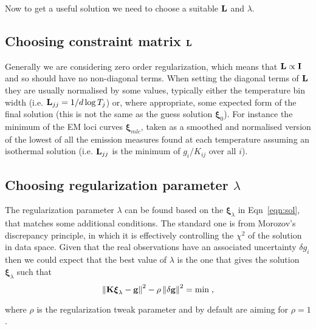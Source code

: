 \documentclass[12pt,a4paper]{article}
\begin{document}
Now to get a useful solution we need to choose a suitable ${\bf L}$ and $\lambda$.

\newpage
\vspace{-10pt}
\subsection*{Choosing constraint matrix ${\bf L}$}

Generally we are considering zero order regularization, which means that ${\bf L} \propto {\bf I}$ and so should have no non-diagonal terms. When setting the diagonal terms of ${\bf L}$ they are usually normalised by some values, typically either the temperature bin width (i.e. ${\bf L}_{jj}=1/d \log T_j$) or, where appropriate, some expected form of the final solution (this is not the same as the guess solution $\boldsymbol{\xi}_0$). For instance the minimum of the EM loci curves $\boldsymbol{\xi}_{mlc}$, taken as a smoothed and normalised version of the lowest of all the emission measures found at each temperature assuming an isothermal solution (i.e. ${\bf L}_{jj}$ is the minimum of $g_i/K_{ij}$ over all $i$).


\vspace{-10pt}
\subsection*{Choosing regularization parameter $\lambda$}

The regularization parameter $\lambda$ can be found based on the $\boldsymbol{\xi}_\lambda$ in Eqn~\ref{eqn:sol}, that matches some additional conditions. The standard one is from Morozov's discrepancy principle, in which it is effectively controlling the $\chi^2$ of the solution in data space. Given that the real observations have an associated uncertainty $\delta g_i$ then we could expect that the best value of $\lambda$ is the one that gives the solution $\boldsymbol{\xi}_\lambda$ such that 
\begin{equation}\label{eqn:desc}
    \left\|\bf{K\boldsymbol{\xi}_\lambda-g}\right\|^2  -  \rho \left\| {\bf \delta g}\right\|^2 = \mathrm{min}\;,
\end{equation}

where $\rho$ is the regularization tweak parameter and by default are aiming for $\rho=1$.



%
%
%
%
\end{document}
